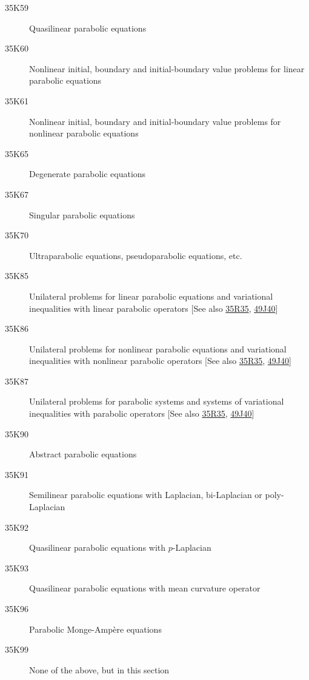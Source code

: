 \begin{description}
\item [35K59]\label{35K59} Quasilinear parabolic equations
\item [35K60]\label{35K60} Nonlinear initial, boundary and initial-boundary value problems for linear parabolic equations
\item [35K61]\label{35K61} Nonlinear initial, boundary and initial-boundary value problems for nonlinear parabolic equations
\item [35K65]\label{35K65} Degenerate parabolic equations
\item [35K67]\label{35K67} Singular parabolic equations
\item [35K70]\label{35K70} Ultraparabolic equations, pseudoparabolic equations, etc.
\item [35K85]\label{35K85} Unilateral problems for linear parabolic equations and variational inequalities with linear parabolic  operators [See also \hyperref[35R35]{35R35}, \hyperref[49J40]{49J40}]
\item [35K86]\label{35K86} Unilateral problems for nonlinear parabolic equations and variational inequalities with nonlinear parabolic  operators [See also \hyperref[35R35]{35R35}, \hyperref[49J40]{49J40}]
\item [35K87]\label{35K87} Unilateral problems for parabolic systems  and systems of variational inequalities with parabolic  operators [See also \hyperref[35R35]{35R35}, \hyperref[49J40]{49J40}]
\item [35K90]\label{35K90} Abstract parabolic equations
\item [35K91]\label{35K91} Semilinear parabolic equations with Laplacian, bi-Laplacian or poly-Laplacian
\item [35K92]\label{35K92} Quasilinear parabolic equations with $p$-Laplacian
\item [35K93]\label{35K93} Quasilinear parabolic equations with mean curvature operator
\item [35K96]\label{35K96} Parabolic Monge-Amp\`{e}re equations
\item [35K99]\label{35K99} None of the above, but in this section
\end{description}
